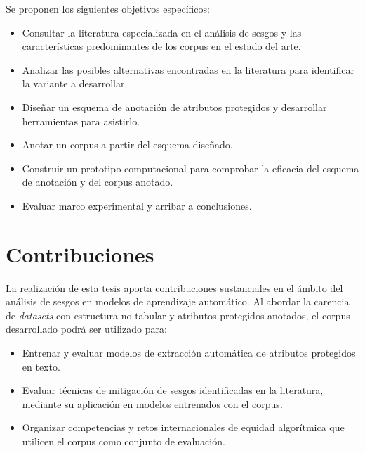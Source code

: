 Se proponen los siguientes objetivos espec\'ificos:
\begin{itemize}
    \item Consultar la literatura especializada en el an\'alisis de sesgos y las caracter\'isticas predominantes de los corpus en el estado del arte.
    \item Analizar las posibles alternativas encontradas en la literatura para identificar la variante a desarrollar.
    \item Dise\~nar un esquema de anotaci\'on de atributos protegidos y desarrollar herramientas para asistirlo.
    \item Anotar un corpus a partir del esquema dise\~nado.
    \item Construir un prototipo computacional para comprobar la eficacia del esquema de anotaci\'on y del corpus anotado.
    \item Evaluar marco experimental y arribar a conclusiones.
\end{itemize}

\section*{Contribuciones}
La realizaci\'on de esta tesis aporta contribuciones sustanciales en el \'ambito del an\'alisis de sesgos en modelos de aprendizaje 
autom\'atico. Al abordar la carencia de \emph{datasets} con estructura no tabular y atributos protegidos anotados, el corpus 
desarrollado podr\'a ser utilizado para:
\begin{itemize}
    \item Entrenar y evaluar modelos de extracci\'on autom\'atica de atributos protegidos en texto.
    \item Evaluar t\'ecnicas de mitigaci\'on de sesgos identificadas en la literatura, mediante su aplicaci\'on en 
    modelos entrenados con el corpus.
    \item Organizar competencias y retos internacionales de equidad algor\'itmica que utilicen el corpus como conjunto de evaluaci\'on.
\end{itemize}




